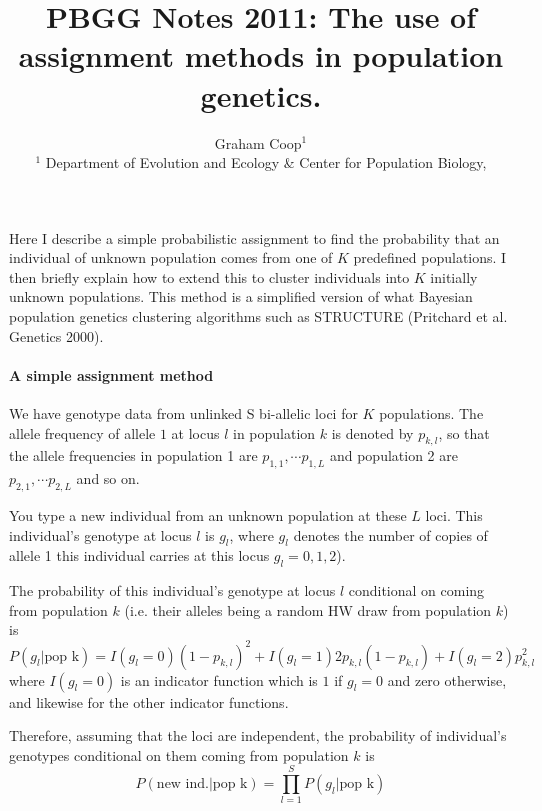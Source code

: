 \documentclass[12pt]{article}
\begin{document}
 
\title{PBGG Notes 2011: The use of assignment methods in population genetics.}
\author{Graham Coop$^{1}$ \\
\small $^1$ Department of Evolution and Ecology \& Center for Population Biology,\\
}
\date{}
\maketitle

Here I describe a simple probabilistic assignment to find the probability that an individual of unknown population comes from one of $K$ predefined populations. I then briefly explain how to extend this to cluster individuals into $K$ initially unknown populations. This method is a simplified version of what Bayesian population genetics clustering algorithms such as STRUCTURE (Pritchard et al. Genetics 2000). 

\paragraph{A simple assignment method}

We have genotype data from unlinked S bi-allelic loci for $K$ populations. The allele frequency of allele $1$ at locus $l$ in population $k$ is denoted by $p_{k,l}$, so that the allele frequencies in population 1 are $p_{1,1},\cdots p_{1,L}$ and population 2 are $p_{2,1},\cdots p_{2,L}$ and so on. 

You type a new individual from an unknown population at these $L$ loci. This individual's genotype at locus $l$ is $g_l$, where $g_l$ denotes the number of copies of allele 1 this individual carries at this locus $g_l=0,1,2$). 

The probability of this individual's genotype at locus $l$ conditional on coming from population $k$ (i.e. their alleles being a random HW draw from population $k$) is 
\begin{equation}
P(g_l | \textrm{pop k}) = I(g_l=0) (1-p_{k,l})^2 +  I(g_l=1) 2 p_{k,l} (1-p_{k,l}) + I(g_l=2) p_{k,l}^2
\end{equation}
where $I(g_l=0)$ is an indicator function which is $1$ if $g_l=0$ and zero otherwise, and likewise for the other indicator functions. 

Therefore, assuming that the loci are independent, the probability of individual's genotypes conditional on them coming from population $k$ is 
\begin{equation}
P(\textrm{new ind.} | \textrm{pop k})  = \prod_{l=1}^S P(g_l | \textrm{pop k}) \label{eqn_assignment}
\end{equation}
\end{document}
